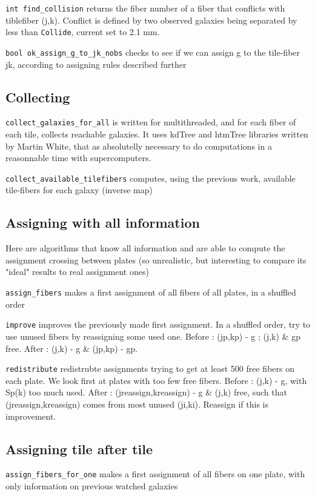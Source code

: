 \documentclass{article}
\begin{document}
 {\tt int find\_collision} returns the fiber number of a fiber that conflicts with tiblefiber (j,k).  Conflict is defined by two observed galaxies being separated by less than {\tt Collide}, current set to 2.1 mm.

{\tt bool  ok\_assign\_g\_to\_jk\_nobs} checks to see if we can assign g to the tile-fiber jk, according to assigning rules described further

\subsection{Collecting}
  {\tt collect\_galaxies\_for\_all} is written for multithreaded, and for each fiber of each tile, collects reachable galaxies. It uses kdTree and htmTree libraries written by Martin White, that as absolutelly necessary to do computations in a reasonnable time with supercomputers.
  
  {\tt collect\_available\_tilefibers} computes, using the previous work, available tile-fibers for each galaxy (inverse map)
  
\subsection{Assigning with all information}
Here are algorithms that know all information and are able to compute the assignment crossing between plates (so unrealistic, but interesting to compare its "ideal" results to real assignment ones)

{\tt assign\_fibers} makes a first assignment of all fibers of all plates, in a shuffled order

{\tt improve} improves the previously made first assignment. In a shuffled order, try to use unused fibers by reassigning some used one. Before : (jp,kp) - g ; (j,k) \& gp free. After : (j,k) - g \& (jp,kp) - gp.

{\tt redistribute} redistrubte assignments trying to get at least 500 free fibers on each plate. We look first at plates with too few free fibers. Before : (j,k) - g, with Sp(k) too much used. After : (jreassign,kreassign) - g \& (j,k) free, such that (jreassign,kreassign) comes from most unused (ji,ki). Reassign if this is improvement.

\subsection{Assigning tile after tile}
{\tt assign\_fibers\_for\_one} makes a first assignment of all fibers on one plate, with only information on previous watched galaxies
\end{document}
